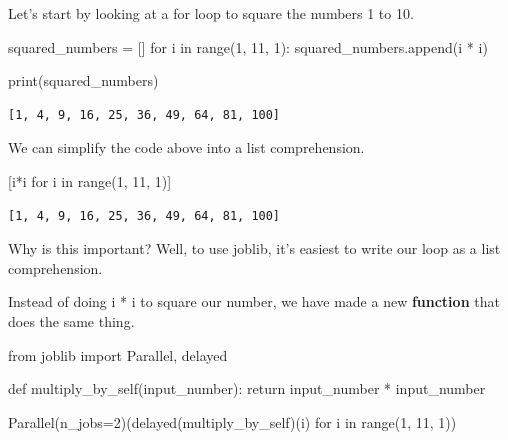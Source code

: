 \documentclass[
  letterpaper,
  DIV=11,
  numbers=noendperiod]{scrreprt}
\newenvironment{Shaded}{}{}
\newcommand{\BuiltInTok}[1]{\textcolor[rgb]{0.84,0.23,0.29}{#1}}
\newcommand{\ControlFlowTok}[1]{\textcolor[rgb]{0.84,0.23,0.29}{#1}}
\newcommand{\DecValTok}[1]{\textcolor[rgb]{0.00,0.36,0.77}{#1}}
\newcommand{\ImportTok}[1]{\textcolor[rgb]{0.01,0.18,0.38}{#1}}
\newcommand{\KeywordTok}[1]{\textcolor[rgb]{0.84,0.23,0.29}{#1}}
\newcommand{\NormalTok}[1]{\textcolor[rgb]{0.14,0.16,0.18}{#1}}
\newcommand{\OperatorTok}[1]{\textcolor[rgb]{0.14,0.16,0.18}{#1}}
\begin{document}
Let's start by looking at a for loop to square the numbers 1 to 10.

\begin{Shaded}
\begin{Highlighting}[]
\NormalTok{squared\_numbers }\OperatorTok{=}\NormalTok{ []}
\ControlFlowTok{for}\NormalTok{ i }\KeywordTok{in} \BuiltInTok{range}\NormalTok{(}\DecValTok{1}\NormalTok{, }\DecValTok{11}\NormalTok{, }\DecValTok{1}\NormalTok{):}
\NormalTok{  squared\_numbers.append(i }\OperatorTok{*}\NormalTok{ i)}

\BuiltInTok{print}\NormalTok{(squared\_numbers)}
\end{Highlighting}
\end{Shaded}

\begin{verbatim}
[1, 4, 9, 16, 25, 36, 49, 64, 81, 100]
\end{verbatim}

We can simplify the code above into a list comprehension.

\begin{Shaded}
\begin{Highlighting}[]
\NormalTok{[i}\OperatorTok{*}\NormalTok{i }\ControlFlowTok{for}\NormalTok{ i }\KeywordTok{in} \BuiltInTok{range}\NormalTok{(}\DecValTok{1}\NormalTok{, }\DecValTok{11}\NormalTok{, }\DecValTok{1}\NormalTok{)]}
\end{Highlighting}
\end{Shaded}

\begin{verbatim}
[1, 4, 9, 16, 25, 36, 49, 64, 81, 100]
\end{verbatim}

Why is this important? Well, to use joblib, it's easiest to write our
loop as a list comprehension.

Instead of doing i * i to square our number, we have made a new
\textbf{function} that does the same thing.

\begin{Shaded}
\begin{Highlighting}[]
\ImportTok{from}\NormalTok{ joblib }\ImportTok{import}\NormalTok{ Parallel, delayed}

\KeywordTok{def}\NormalTok{ multiply\_by\_self(input\_number):}
  \ControlFlowTok{return}\NormalTok{ input\_number }\OperatorTok{*}\NormalTok{ input\_number}

\NormalTok{Parallel(n\_jobs}\OperatorTok{=}\DecValTok{2}\NormalTok{)(delayed(multiply\_by\_self)(i) }\ControlFlowTok{for}\NormalTok{ i }\KeywordTok{in} \BuiltInTok{range}\NormalTok{(}\DecValTok{1}\NormalTok{, }\DecValTok{11}\NormalTok{, }\DecValTok{1}\NormalTok{))}
\end{Highlighting}
\end{Shaded}
\end{document}
